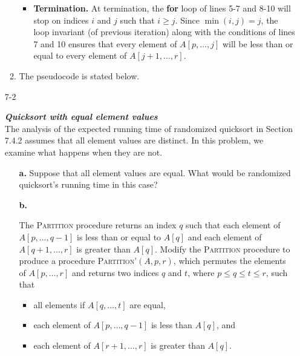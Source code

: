 \documentclass{report}
\makeatletter
\renewenvironment{framed}{%
 \def\FrameCommand##1{\hskip\@totalleftmargin
 \fboxsep=\FrameSep\fbox{##1}}%
 \MakeFramed {\advance\hsize-\width
   \@totalleftmargin\z@ \linewidth\hsize
   \@setminipage}}%
 {\par\unskip\endMakeFramed}
\let\oldnl\nl%
\newcommand{\nonl}{\renewcommand{\nl}{\let\nl\oldnl}}%
\makeatother
\begin{document}
\begin{enumerate}
\begin{framed}
\begin{enumerate}
{\begin{itemize}
$A[j] \le x$, we have $A[i] \ge A[j]$. To go to the next iteration line 11
must be valid and the exchange of $A[i]$ with $A[j]$ at line 12 maintains the
loop invariant.
\item \textbf{Termination.} At termination, the \textbf{for} loop of lines 5-7
and 8-10 will stop on indices $i$ and $j$ such that $i \ge j$. Since
$\min(i, j) = j$, the loop invariant (of previous iteration) along with the
conditions of lines 7 and 10 ensures that every element of $A[p, \dots, j]$
  will be less than or equal to every element of $A[j + 1, \dots, r]$.
\end{itemize}
}
\item{The pseudocode is stated below.

\begin{algorithm}[H]
\SetAlgoNoEnd\DontPrintSemicolon
\BlankLine
{}
\nonl{}
\end{algorithm}
}
\end{enumerate}
\end{framed}

\newpage

\item[7{-}2]{\textbf{\emph{Quicksort with equal element values}}\\
The analysis of the expected running time of randomized quicksort in Section
7.4.2 assumes that all element values are distinct. In this problem, we examine
what happens when they are not.

\begin{enumerate}
\item[\textbf{a.}]{Suppose that all element values are equal. What would be
randomized quicksort's running time in this case?}

\item[\textbf{b.}]{The \textsc{Partition} procedure returns an index $q$ such
that each element of $A[p, \dots, q - 1]$ is less than or equal to $A[q]$ and
each element of $A[q + 1, \dots, r]$ is greater than $A[q]$. Modify the
\textsc{Partition} procedure to produce a procedure
\textsc{Partition'}$(A, p, r)$, which permutes the elements of $A[p, \dots, r]$
and returns two indices $q$ and $t$, where $p \le q \le t \le r$, such that
\begin{itemize}
\item{all elements if $A[q, \dots, t]$ are equal,}
\item{each element of $A[p, \dots, q - 1]$ is less than $A[q]$, and}
\item{each element of $A[r + 1, \dots, r]$ is greater than $A[q]$.}
\end{itemize}

}
\end{enumerate}}
\end{enumerate}
\end{document}
